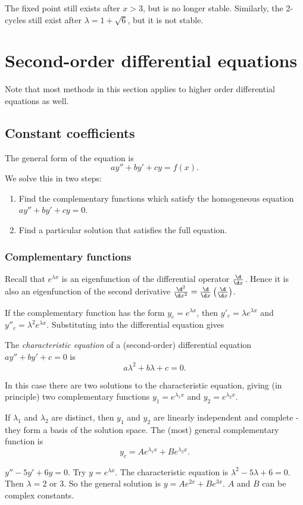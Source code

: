 \documentclass[a4paper]{article}
\begin{document}
  \note The fixed point still exists after $x > 3$, but is no longer stable. Similarly, the 2-cycles still exist after $\lambda = 1 + \sqrt{6}$, but it is not stable.

  \section{Second-order differential equations}
  Note that most methods in this section applies to higher order differential equations as well.
  \subsection{Constant coefficients}
  The general form of the equation is 
  \[
    ay'' + by' + cy = f(x).
  \]
  We solve this in two steps:
  \begin{enumerate}
    \item Find the complementary functions which satisfy the homogeneous equation $ay'' + by' + cy = 0$.
    \item Find a particular solution that satisfies the full equation.
  \end{enumerate}
  \subsubsection{Complementary functions}
  Recall that $e^{\lambda x}$ is an eigenfunction of the differential operator $\frac{\d}{\d x}$. Hence it is also an eigenfunction of the second derivative $\frac{\d^2}{\d x^2} = \frac{\d}{\d x}\left(\frac{\d }{\d x}\right)$.

  If the complementary function has the form $y_c = e^{\lambda x}$, then $y'_c = \lambda e^{\lambda x}$ and $y''_c = \lambda^2 e^{\lambda x}$. Substituting into the differential equation gives
  \begin{defi}
    The \emph{characteristic equation} of a (second-order) differential equation $ay'' + by' + c = 0$ is
    \[
      a\lambda^2 + b\lambda + c = 0.
    \]
  \end{defi}

  In this case there are two solutions to the characteristic equation, giving (in principle) two complementary functions $y_1 = e^{\lambda_1 x}$ and $y_2 = e^{\lambda_2 x}$.

  If $\lambda_1$ and $\lambda_2$ are distinct, then $y_1$ and $y_2$ are linearly independent and complete - they form a basis of the solution space. The (most) general complementary function is
  \[
    y_c = Ae^{\lambda_1 x} + Be^{\lambda_2 x}.
  \]
  \begin{eg}
    $y'' - 5y' + 6y = 0$. Try $y = e^{\lambda x}$. The characteristic equation is $\lambda^2 - 5\lambda + 6 = 0$. Then $\lambda = 2$ or $3$. So the general solution is $y = Ae^{2x} + Be^{3x}$.
    \note $A$ and $B$ can be complex constants.
  \end{eg}
\end{document}
